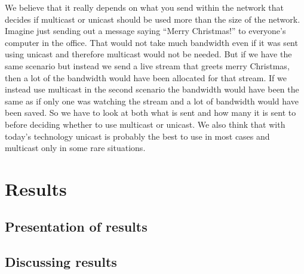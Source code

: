 \documentclass[9pt,a4paper]{acmproc}
\begin{document}
We believe that it really depends on what you send within the network that decides if multicast or unicast should be used more than the size of the network. Imagine just sending out a message saying “Merry Christmas!” to everyone's computer in the office. That would not take much bandwidth even if it was sent using unicast and therefore multicast would not be needed. But if we have the same scenario but instead we send a live stream that greets merry Christmas, then a lot of the bandwidth would have been allocated for that stream. If we instead use multicast in the second scenario the bandwidth would have been the same as if only one was watching the stream and a lot of bandwidth would have been saved. So we have to look at both what is sent and how many it is sent to before deciding whether to use multicast or unicast. We also think that with today's technology unicast is probably the best to use in most cases and multicast only in some rare situations. \cite{multExplained} \cite{whatIsMult} \cite{understandIpMult} 


\clearpage

\section{Results}

\subsection{Presentation of results}

\subsection{Discussing results}

\clearpage
\end{document}
